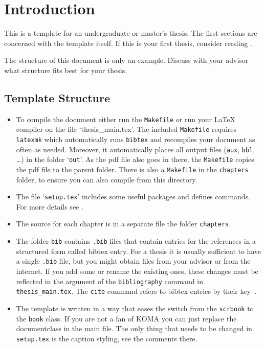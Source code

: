 \chapter{Introduction}\label{chap:introduction}
This is a template for an undergraduate or master's thesis.
The first sections are concerned with the template itself. If this is your first
thesis, consider reading .

The structure of this document is only an example.
Discuss with your advisor what structure fits best for your thesis.

\section{Template Structure}
\begin{itemize}
    \item To compile the document either run the \texttt{Makefile} or run your LaTeX compiler on the file `\textrm{thesis\_main.tex}'. The included \texttt{Makefile} requires \texttt{latexmk} which automatically runs \texttt{bibtex} and recompiles your document as often as needed. Moreover, it automatically places all output files (\texttt{aux}, \texttt{bbl}, \dots) in the folder `\texttt{out}'. As the pdf file also goes in there, the \texttt{Makefile} copies the pdf file to the parent folder. There is also a \texttt{Makefile} in the \texttt{chapters} folder, to ensure you can also compile from this directory.

    \item The file `\texttt{setup.tex}' includes some useful packages and defines commands. For more details see .

    \item The source for each chapter is in a separate file the folder \texttt{chapters}.

    \item The folder \texttt{bib} contains \texttt{.bib} files that
      contain entries for the references in a structured form called
      bibtex entry. For a thesis it is usually sufficient to have a
      single \texttt{.bib} file, but you might obtain files from your
      advisor or from the internet. If you add some or rename the
      existing ones, these changes must be reflected in the argument
      of the \texttt{bibliography} command in
      \texttt{thesis\_main.tex}. The \texttt{cite} command refers to
      bibtex entries by their key~\cite{kingma2014adam,
        bromley1993siamesesignature,muja2009flann}.

    \item The template is written in a way that eases the switch from
      the \texttt{scrbook} to the \texttt{book} class. If you are not
      a fan of KOMA you can just replace the documentclass in the main
      file. The only thing that needs to be changed in
      \texttt{setup.tex} is the caption styling, see the comments
      there.
\end{itemize}


